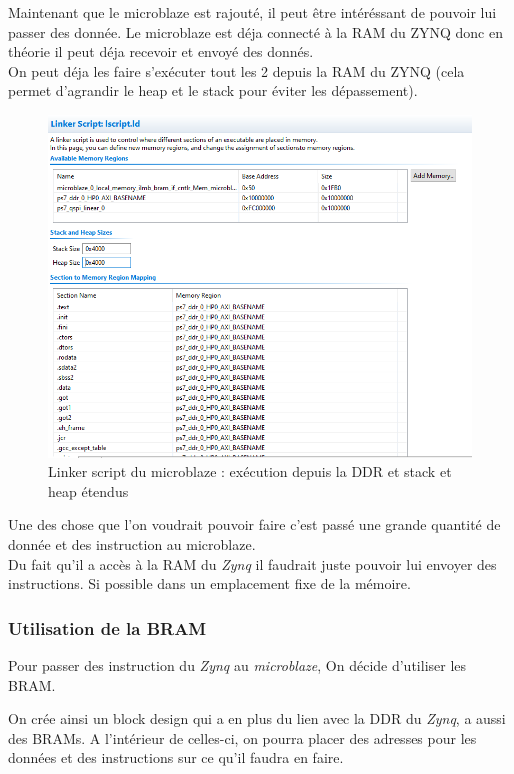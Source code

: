\documentclass[12pt,a4paper]{article}
\begin{document}
Maintenant que le microblaze est rajouté, il peut être intéréssant de pouvoir lui passer des donnée. Le microblaze est déja connecté à la RAM du ZYNQ donc en théorie il peut déja recevoir et envoyé des donnés.\\
On peut déja les faire s'exécuter tout les 2 depuis la RAM du ZYNQ (cela permet d'agrandir le heap et le stack pour éviter les dépassement).
\begin{figure}[H]
	\centering
		\includegraphics[width=\linewidth]{im/mb2.png}	
	\caption{Linker script du microblaze : exécution depuis la DDR et stack et heap étendus}
	\label{fig-link}
\end{figure}

Une des chose que l'on voudrait pouvoir faire c'est passé une grande quantité de donnée et des instruction au microblaze.\\
Du fait qu'il a accès à la RAM du \textit{Zynq} il faudrait juste pouvoir lui envoyer des instructions. Si possible dans un emplacement fixe de la mémoire.
\subsubsection{Utilisation de la BRAM}
Pour passer des instruction du \textit{Zynq} au \textit{microblaze}, On décide d'utiliser les BRAM.

On crée ainsi un block design qui a en plus du lien avec la DDR du \textit{Zynq}, a aussi des BRAMs. A l'intérieur de celles-ci, on pourra placer des adresses pour les données et des instructions sur ce qu'il faudra en faire.
\end{document}
